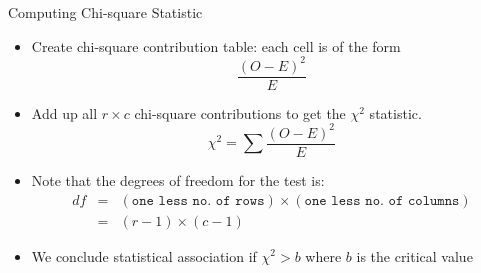 \documentclass[14pt]{beamer}\usepackage[]{graphicx}\usepackage[]{color}
\begin{document}
\begin{frame}[fragile]{Computing Chi-square Statistic}

{\small{
\begin{itemize}
\item<1-> Create chi-square contribution table: each cell is of the form
{\footnotesize{
\begin{equation*}
\frac{(O - E)^2}{E}
\end{equation*}
}}

\vspace{-3mm}

\item<2-> Add up all $r \times c$ chi-square contributions to get the $\chi^2$ statistic.
{\footnotesize{
\begin{equation*}
\chi^2 = \sum \frac{(O - E)^2}{E}
\end{equation*}
}}

\vspace{-3mm}

\item<3-> Note that the degrees of freedom for the test is:
{\footnotesize{
\begin{eqnarray*}
df &=& (\texttt{one less no. of rows}) \times (\texttt{one less no. of columns}) \\
  &=& (r - 1) \times (c - 1)
\end{eqnarray*}
}}

\vspace{-6mm}

\item<4-> We conclude statistical association if $\chi^2 > b$ where $b$ is the critical value
\end{itemize}
}}
\end{frame}
\end{document}
